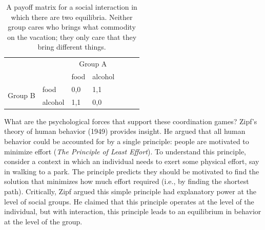 \documentclass[man, noapacite, 12pt]{apa2}
\begin{document}
\begin{table}[t]
\begin{center}
\begin{tabular}{l p{3cm} l p{3cm} l p{3cm} l}
 &  & \multicolumn{2}{c}{Group A} \\ \cline{2-4} 
\multicolumn{1}{l|}{} & \multicolumn{1}{l|}{} & \multicolumn{1}{l|}{food} & \multicolumn{1}{l|}{alcohol} \\ \cline{2-4} 
\multicolumn{1}{c|}{\multirow{2}{*}{Group B}} & \multicolumn{1}{l|}{food} & \multicolumn{1}{l|}{0,0} & \multicolumn{1}{l|}{1,1} \\ \cline{2-4} 
\multicolumn{1}{c|}{} & \multicolumn{1}{l|}{alcohol} & \multicolumn{1}{l|}{1,1} & \multicolumn{1}{l|}{0,0} \\ \cline{2-4} 
\end{tabular}
\caption{A payoff matrix for a social interaction in which there are two equilibria. Neither group cares who brings what commodity on the vacation; they only care that they bring different things. }
\end{center}
\end{table}

What are the psychological forces that support these coordination games? Zipf's theory of human behavior (1949) provides  insight. He argued that all human behavior could be accounted for by a single principle: people are motivated to minimize effort ({\it The Principle of Least Effort}). To understand this principle, consider a context in which an individual needs to exert some physical effort, say in walking to a park. The principle predicts they should be motivated to find the solution that minimizes how much effort required (i.e., by finding the shortest path). Critically, Zipf argued this simple principle had explanatory power at the level of social groups. He claimed that this principle operates at the level of the individual, but with interaction, this principle leads to an equilibrium in behavior at the level of the group.
\end{document}
